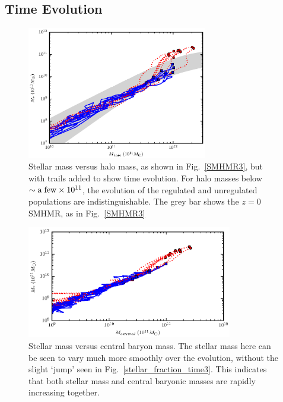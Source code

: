 \subsection{Time Evolution} 
\begin{figure}
    \includegraphics[width=0.7\textwidth]{figures3/SMHMR_time.eps}
    \caption[Stellar mass vs. halo mass evolution in MUGS2]{Stellar mass versus
    halo mass, as shown in Fig.~\ref{SMHMR3}, but with trails added to show time
    evolution.  For halo masses below $\sim\rm{a\;few}\times10^{11}$, the
    evolution of the regulated and unregulated populations are
    indistinguishable.  The grey bar shows the $z=0$ SMHMR, as in
    Fig.~\ref{SMHMR3}}
    \label{SMHMR_time3}
\end{figure}
\begin{figure}
    \includegraphics[width=0.8\textwidth]{figures3/stellar_central_time.eps}
    \caption[Stellar mass vs. central baryonic mass evolution in MUGS2]{Stellar
    mass versus central baryon mass. The stellar mass here can be seen to vary
    much more smoothly over the evolution, without the slight `jump' seen in
    Fig.~\ref{stellar_fraction_time3}.  This indicates that both stellar mass
    and central baryonic masses are rapidly increasing together.}
    \label{stellar_central_time3}
\end{figure}

